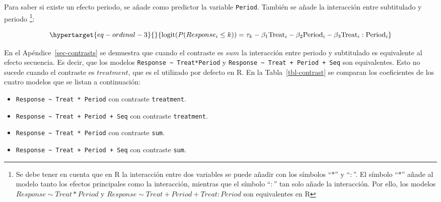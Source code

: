 \documentclass[
  12pt,
  a4paper,
  extrafontsizes,
  onecolumn,
  openright,
  table]{memoir}
\providecommand{\tightlist}{%
  \setlength{\itemsep}{0pt}\setlength{\parskip}{0pt}}\usepackage{longtable,booktabs,array}
\begin{document}
Para saber si existe un efecto periodo, se añade como predictor la
variable \texttt{Period}. También se añade la interacción entre
subtitulado y periodo \footnote{Se debe tener en cuenta que en R la
  interacción entre dos variables se puede añadir con los símbolos
  \enquote{\(*\)} y \enquote{\(:\)}. El símbolo \enquote{\(*\)} añade al
  modelo tanto los efectos principales como la interacción, mientras que
  el símbolo \enquote{\(:\)} tan solo añade la interacción. Por ello,
  los modelos \(Response \sim Treat*Period\) y
  \(Response \sim Treat + Period + Treat:Period\) son equivalentes en R}:

\small

\begin{equation}\protect\hypertarget{eq-ordinal-3}{}{
\text{logit}(P(Response_i \leq k)) = \tau_k - \beta_1 \text{Treat}_i - \beta_2 \text{Period}_i - \beta_3 \text{Treat}_i : \text{Period}_i
}\label{eq-ordinal-3}\end{equation}

\normalsize

En el Apéndice~\ref{sec-contrasts} se demuestra que cuando el contraste
es \(sum\) la interacción entre periodo y subtitulado es equivalente al
efecto secuencia. Es decir, que los modelos
\texttt{Response\ \textasciitilde{}\ Treat*Period} y
\texttt{Response\ \textasciitilde{}\ Treat\ +\ Period\ +\ Seq} son
equivalentes. Esto no sucede cuando el contraste es \(treatment\), que
es el utilizado por defecto en R. En la Tabla~\ref{tbl-contrast} se
comparan los coeficientes de los cuatro modelos que se listan a
continuación:

\begin{itemize}
\tightlist
\item
  \texttt{Response\ \textasciitilde{}\ Treat\ *\ Period} con contraste
  \texttt{treatment}.
\item
  \texttt{Response\ \textasciitilde{}\ Treat\ +\ Period\ +\ Seq} con
  contraste \texttt{treatment}.
\item
  \texttt{Response\ \textasciitilde{}\ Treat\ *\ Period} con contraste
  \texttt{sum}.
\item
  \texttt{Response\ \textasciitilde{}\ Treat\ +\ Period\ +\ Seq} con
  contraste \texttt{sum}.
\end{itemize}

\tiny
\end{document}
